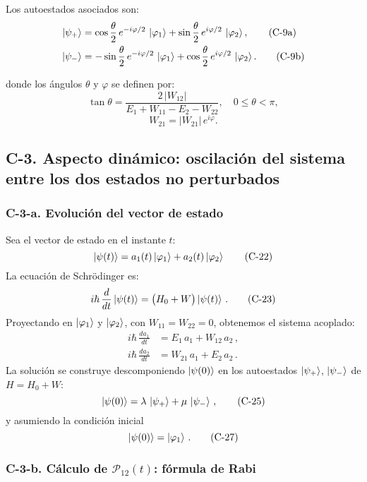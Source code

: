 \documentclass[a4paper,11pt]{article}
\begin{document}
Los autoestados asociados son:
\begin{align}
\ket{\psi_+}
&= \cos\frac{\theta}{2}\,e^{-i\varphi/2}\,\ket{\varphi_1}
+ \sin\frac{\theta}{2}\,e^{i\varphi/2}\,\ket{\varphi_2},
\tag{C-9a}\\
\ket{\psi_-}
&= -\sin\frac{\theta}{2}\,e^{-i\varphi/2}\,\ket{\varphi_1}
+ \cos\frac{\theta}{2}\,e^{i\varphi/2}\,\ket{\varphi_2}.
\tag{C-9b}
\end{align}

donde los ángulos \(\theta\) y \(\varphi\) se definen por:
\begin{equation}
\tan\theta
= \frac{2\,|W_{12}|}{E_1 + W_{11} - E_2 - W_{22}},
\quad
0 \le \theta < \pi,
\tag{C-10}
\end{equation}
\begin{equation}
W_{21} = |W_{21}|\,e^{i\varphi}.
\tag{C-11}
\end{equation}

\subsection*{C-3. Aspecto dinámico: oscilación del sistema entre los dos estados no perturbados}

\subsubsection*{C-3-a. Evolución del vector de estado}

Sea el vector de estado en el instante \(t\):
\[
\ket{\psi(t)} = a_1(t)\ket{\varphi_1} + a_2(t)\ket{\varphi_2}
\tag{C-22}
\]
La ecuación de Schrödinger es:
\[
i\hbar\,\frac{d}{dt}\ket{\psi(t)} = \bigl(H_0 + W\bigr)\ket{\psi(t)}\,.
\tag{C-23}
\]
Proyectando en \(\ket{\varphi_1}\) y \(\ket{\varphi_2}\), con \(W_{11}=W_{22}=0\), obtenemos el sistema acoplado:
\[
\begin{aligned}
i\hbar\,\frac{da_1}{dt} &= E_1\,a_1 + W_{12}\,a_2\,,\\
i\hbar\,\frac{da_2}{dt} &= W_{21}\,a_1 + E_2\,a_2\,.
\end{aligned}
\tag{C-24}
\]
La solución se construye descomponiendo \(\ket{\psi(0)}\) en los autoestados \(\ket{\psi_+}\), \(\ket{\psi_-}\) de \(H=H_0+W\):
\[
\ket{\psi(0)}=\lambda\,\ket{\psi_+}+\mu\,\ket{\psi_-}\,,
\tag{C-25}
\]
y asumiendo la condición inicial
\[
\ket{\psi(0)}=\ket{\varphi_1}\,.
\tag{C-27}
\]

\subsubsection*{C-3-b. Cálculo de \(\mathcal{P}_{12}(t)\): fórmula de Rabi}
\end{document}
